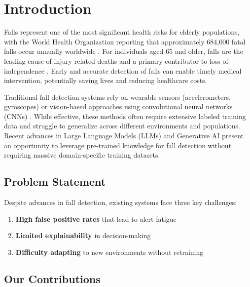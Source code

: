 \documentclass[conference]{IEEEtran}
\begin{document}
\section{Introduction}

Falls represent one of the most significant health risks for elderly populations, with the World Health Organization reporting that approximately 684,000 fatal falls occur annually worldwide \cite{who2021falls}. For individuals aged 65 and older, falls are the leading cause of injury-related deaths and a primary contributor to loss of independence \cite{cdc2020falls}. Early and accurate detection of falls can enable timely medical intervention, potentially saving lives and reducing healthcare costs.

Traditional fall detection systems rely on wearable sensors (accelerometers, gyroscopes) or vision-based approaches using convolutional neural networks (CNNs) \cite{noury2007fall, mubashir2013survey}. While effective, these methods often require extensive labeled training data and struggle to generalize across different environments and populations. Recent advances in Large Language Models (LLMs) and Generative AI present an opportunity to leverage pre-trained knowledge for fall detection without requiring massive domain-specific training datasets.

\subsection{Problem Statement}

Despite advances in fall detection, existing systems face three key challenges:
\begin{enumerate}[leftmargin=*]
    \item \textbf{High false positive rates} that lead to alert fatigue
    \item \textbf{Limited explainability} in decision-making
    \item \textbf{Difficulty adapting} to new environments without retraining
\end{enumerate}

\subsection{Our Contributions}
\end{document}
